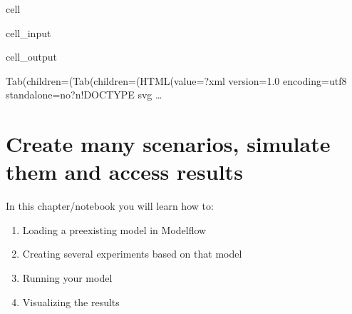 \documentclass[letterpaper,10pt,english]{jupyterBook}
\begin{document}
\begin{sphinxuseclass}{cell}\begin{sphinxVerbatimInput}

\begin{sphinxuseclass}{cell_input}
\begin{sphinxVerbatim}[commandchars=\\\{\}]
\PYG{p}{[}\PYG{p}{]}
\end{sphinxVerbatim}

\end{sphinxuseclass}\end{sphinxVerbatimInput}
\begin{sphinxVerbatimOutput}

\begin{sphinxuseclass}{cell_output}
\begin{sphinxVerbatim}[commandchars=\\\{\}]
Tab(children=(Tab(children=(HTML(value=\PYGZsq{}\PYGZlt{}?xml version=\PYGZdq{}1.0\PYGZdq{} encoding=\PYGZdq{}utf\PYGZhy{}8\PYGZdq{} standalone=\PYGZdq{}no\PYGZdq{}?\PYGZgt{}\PYGZbs{}n\PYGZlt{}!DOCTYPE svg …
\end{sphinxVerbatim}

\begin{sphinxVerbatim}[commandchars=\\\{\}]

\end{sphinxVerbatim}

\end{sphinxuseclass}\end{sphinxVerbatimOutput}

\end{sphinxuseclass}
\sphinxstepscope


\chapter{Create many scenarios, simulate them  and access results}
\label{\detokenize{content/howto/experiments/create_save_scenarios:create-many-scenarios-simulate-them-and-access-results}}\label{\detokenize{content/howto/experiments/create_save_scenarios::doc}}
\sphinxAtStartPar
In this chapter/notebook you will learn how to:
\begin{enumerate}
%
\item {} 
\sphinxAtStartPar
Loading a pre\sphinxhyphen{}existing model in Modelflow

\item {} 
\sphinxAtStartPar
Creating several experiments based on that model

\item {} 
\sphinxAtStartPar
Running your model

\item {} 
\sphinxAtStartPar
Visualizing the results

\end{enumerate}
\end{document}
